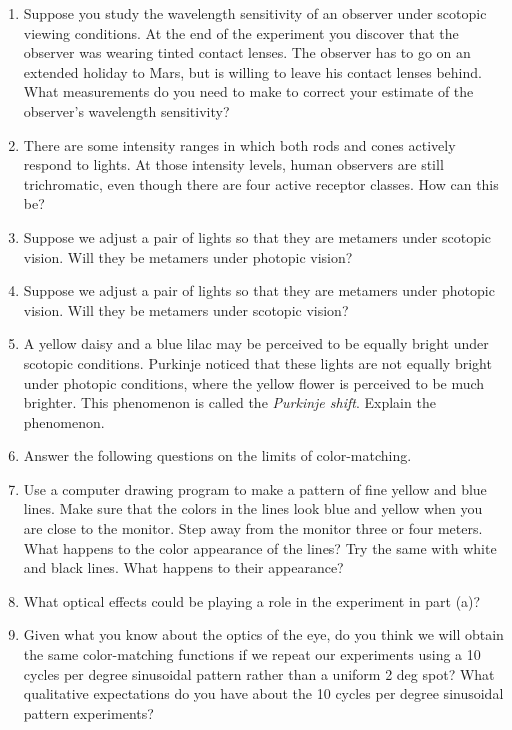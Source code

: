 \begin{enumerate}
 \be

 \item  Suppose you study the wavelength sensitivity
of an observer under scotopic viewing conditions.
At the end of the experiment you discover that the observer
was wearing tinted contact lenses.
The observer has to go on an extended holiday to Mars, but
is willing to leave his contact lenses behind.
What measurements do you need to make to correct
your estimate of the observer's wavelength sensitivity?

 \item  There are some intensity ranges in which both rods and
cones actively respond to lights.
At those intensity levels, human observers are still
trichromatic, even though there are four active receptor classes.
How can this be?

 \item Suppose we adjust a pair of lights so that they
are metamers under scotopic vision.
Will they be metamers under photopic vision?

 \item Suppose we adjust a pair of lights so that they
are metamers under photopic vision.
Will they be metamers under scotopic vision?

 \item A yellow daisy and a blue lilac
may be perceived to be equally bright
under scotopic conditions.  Purkinje noticed that these
lights are not equally bright under photopic conditions,
where the yellow flower is perceived to be much brighter.
This phenomenon is called the {\em Purkinje shift}.
Explain the phenomenon.

 \ee

\item Answer the following questions on the limits of color-matching.

 \be

 \item  Use a computer drawing
program to make a pattern of fine yellow and blue lines.
Make sure that the colors in the lines look blue and yellow
when you are close to the monitor.
Step away from the monitor three or four meters.
What happens to the color appearance of the lines?
Try the same with white and black lines.
What happens to their appearance?

 \item What optical effects could be playing a role in the
experiment in part (a)?

 \item Given what you know about the optics of the eye,
do you think we will obtain the same color-matching functions
if we repeat our experiments using a 10 cycles per degree sinusoidal
pattern rather than a uniform 2 deg spot?
What qualitative expectations do you have about the
10 cycles per degree sinusoidal pattern experiments?


\end{enumerate}
